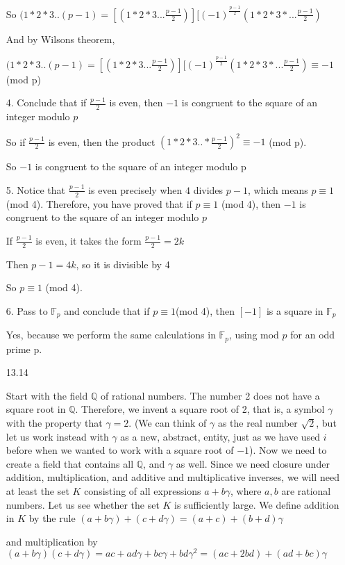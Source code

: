 \documentclass[12pt]{article}
\begin{document}
\begin{itemize}
	So $(1*2*3.. (p-1) = [(1*2*3...\frac{p-1}{2})][(-1)^{\frac{p-1}{2}}(1*2*3*...\frac{p-1}{2})$

	And by Wilsons theorem,

	$(1*2*3.. (p-1) = [(1*2*3...\frac{p-1}{2})][(-1)^{\frac{p-1}{2}}(1*2*3*...\frac{p-1}{2}) \equiv -1$ (mod p)

	4. Conclude that if $\frac{p-1}{2}$ is even, then $-1$ is congruent to the square of an integer modulo $p$

	So if $\frac{p-1}{2}$ is even, then the product $(1*2*3..*\frac{p-1}{2})^2 \equiv -1$ (mod p).	

	So $-1$ is congruent to the square of an integer modulo p

	5. Notice that $\frac{p-1}{2}$ is even precisely when $4$ divides $p-1$, which means $p\equiv 1$ (mod 4). Therefore, you have proved that if $p\equiv1$ (mod 4), then $-1$ is congruent to the square of an integer modulo $p$

	If $\frac{p-1}{2}$ is even, it takes the form $\frac{p-1}{2} = 2k$

	Then $p-1 = 4k$, so it is divisible by 4

	So $p \equiv 1$ (mod 4). 

	6. Pass to $\mathbb{F}_p$ and conclude that if $p \equiv 1$(mod 4), then $[-1]$ is a square in $\mathbb{F}_p$

	Yes, because we perform the same calculations in $\mathbb{F}_p$, using mod $p$ for an odd prime p.


\newpage
\item[13.14]

	Start with the field $\mathbb{Q}$ of rational numbers. The number 2 does not have a square root in $\mathbb{Q}$. Therefore, we invent a square root of 2, that is, a symbol $\gamma$ with the property that $\gamma =2$. (We can think of $\gamma$ as the real number $\sqrt{2}$, but let us work instead with $\gamma$ as a new, abstract, entity, just as we have used $i$ before when we wanted to work with a square root of $-1$). Now we need to create a field that contains all $\mathbb{Q}$, and $\gamma$ as well. Since we need closure under addition, multiplication, and additive and multiplicative inverses, we will need at least the set $K$ consisting of all expressions $a + b\gamma$, where $a,b$ are rational numbers. Let us see whether the set $K$ is sufficiently large. We define addition in $K$ by the rule $(a+b\gamma) + (c+d\gamma) = (a+c) + (b+d)\gamma$

	and multiplication by $(a+b\gamma)(c+d\gamma) = ac + ad\gamma + bc\gamma + bd\gamma^2 = (ac + 2bd) + (ad + bc)\gamma$


\end{itemize}
\end{document}
